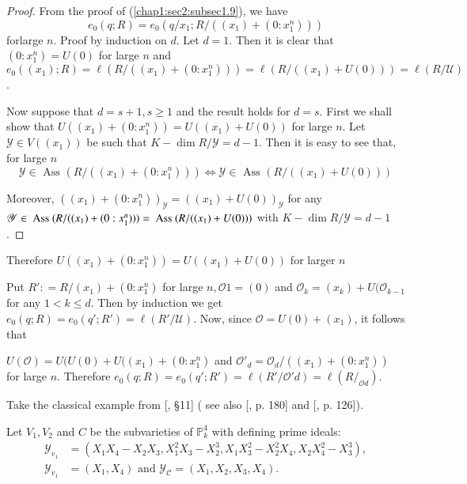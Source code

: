 \begin{proof}
  From the proof of (\ref{chap1:sec2:subsec1.9}), we have 
  $$
  e_0(q;R) = e_0 (q/ x_1 ; R/ ((x_1) + (0:  x^n_1)))
  $$
  for\pageoriginale large $n$. Proof by induction on $d$. Let
  $d=1$. Then it is clear 
  that $(0:  x^n_1) =U(0)$ for large $n$ and $e_0((x_1);R) = \ell(R/((x_1)
  + (0:  x^n_1))) = \ell (R/((x_1) +U (0 ))) = \ell (R/ \mathscr{U})$.  
  
  Now suppose that $d = s+ 1, s \geq 1$ and the result holds for
  $d=s$. First we shall show that $U((x_1) + (0:  x^n_1)) = U((x_1) +
  U(0))$ for large $n$. Let $\mathscr{Y} \in V((x_1))$ be such that $K-
  \dim R/ \mathscr{Y} = d-1$. Then it is easy to see that, for large
  $n$  
  $$
  \mathscr{Y} \in \text{ Ass }(R/ ((x_1) + (0:  x^n_1)))
  \Longleftrightarrow \mathscr{Y} \in \text{ Ass }(R/ ((x_1) + U( 0))) 
  $$

  Moreover, $((x_1) + (0:  x^n_1))_{ \mathscr{Y}} =((x_1) + U(
  0))_{\mathscr{Y}} $ for any $\mathscr{Y} \in \text{ Ass }\break (R/ ((x_1) +
  (0:  x^n_1))) = \text{ Ass } (R/ ((x_1) + U( 0)))$ with $K-\dim R/
  \mathscr{Y} = d-1$.  
\end{proof}

Therefore $U((x_1) + (0:  x^n_1)) =U((x_1) +U(0)) $ for larger $n$

Put $R':  = R/(x_1) + (0:  x^n_1)$ for large $n, \mathscr{O}1= (0)$
and $\mathscr{O}_k = (x_k) + U (\mathscr{O}_{k-1}$ for any $1 < k \leq
d$. Then by induction we get $e_0 (q;R) = e_0(q';R') = \ell( R' /
\mathcal{U})$. Now, since $\mathscr{O}= U(0) + (x_1)$, it follows that  

$U(\mathscr{O})=U(U(0)+U((x_1)+(0:x^n_1)$ and
$\mathscr{O}'_d=\mathscr{O}_d/((x_1)+(0:x^n_1))$ for large
$n$. Therefore
$e_0(q;R)=e_0(q';R')=\ell(R'/\mathscr{O}'d)=\ell(R/_{\mathscr{O}d})$.  

\setcounter{example}{25}
\begin{example}\label{chap1:sec2:exp1.26}
  Take the classical example from [\cite{90}, \S 11] ( see also [\cite{26},
    p. 180] and [\cite{50}, p. 126]).  
  
  Let $V_1, V_2$ and $C$ be the subvarieties of $\mathds{P}^4_k$ with
  defining prime ideals: 
  \begin{align*}
    \mathscr{Y}_{v_1} & =(X_1 X_4-X_2 X_3, X^2_1 X_3-X^3_2,
    X_1X^2_3-X^2_2 X_4, X_2X^2_4 -X^3_3), \\ 
    \mathscr{Y}_{v_1} & =(X_1, X_4) \text{ and } \mathscr{Y_C}=(X_1,
    X_2, X_3, X_4).  
  \end{align*}
\end{example}

